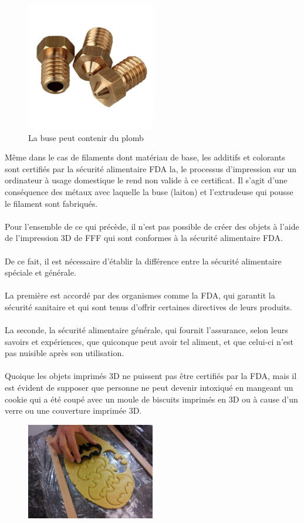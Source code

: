 \documentclass[11pt,a4paper]{article}
\begin{document}
\begin{figure}[H]
\centering
\includegraphics[width=0.5\textwidth,cfbox=azul_marcos 1pt 0pt]{FOTOS/NOZZLES}
\caption*{La buse peut contenir du plomb}
\end{figure}
Même dans le cas de filaments dont matériau de base, les additifs et colorants sont certifiés par la sécurité alimentaire FDA la, le processus d’impression sur un ordinateur à usage domestique le rend non valide à ce certificat.  Il s’agit d’une conséquence des métaux avec laquelle la buse (laiton) et l’extrudeuse qui pousse le filament sont fabriqués.
\\\\
Pour l’ensemble de ce qui précède, il n’est pas possible de créer des objets à l’aide de l’impression 3D de FFF qui sont conformes à la sécurité alimentaire FDA.
\\\\
De ce fait, il est nécessaire d’établir la différence entre la sécurité alimentaire spéciale et générale.
\\\\
La première est accordé par des organismes comme la FDA, qui garantit la sécurité sanitaire et qui sont tenus d’offrir certaines directives de leurs produits.
\\\\
La seconde, la sécurité alimentaire générale, qui fournit l’assurance, selon leurs savoirs et expériences, que quiconque peut avoir tel aliment, et que celui-ci n’est pas nuisible après son utilisation.
\\\\
Quoique les objets imprimés 3D ne puissent pas être certifiés par la FDA, mais il est évident de supposer que personne ne peut devenir intoxiqué en mangeant un cookie qui a été coupé avec un moule de biscuits imprimés en 3D ou à cause d’un verre ou une couverture imprimée 3D.
\begin{figure}[H]
\centering
\includegraphics[width=0.5\textwidth,cfbox=azul_marcos 1pt 0pt]{FOTOS/CORTADORGALLETAS}
\end{figure}
\end{document}
